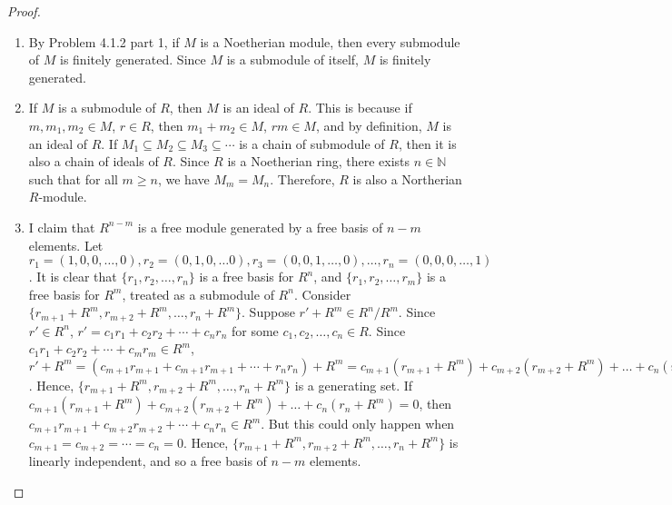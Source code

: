 \documentclass[12pt]{article}
\newcommand{\N}{\mathbb{N}}
\begin{document}
\begin{proof}
\begin{enumerate}
    \item By Problem 4.1.2 part 1, if $M$ is a Noetherian module, then every submodule of $M$ is finitely generated. Since $M$ is a submodule of itself, $M$ is finitely generated.
    \item  If $M$ is a submodule of $R$, then $M$ is an ideal of $R$. This is because if $m, m_1, m_2 \in M$, $r \in R$, then $m_1+m_2 \in M$, $rm \in M$, and by definition, $M$ is an ideal of $R$. If $M_1 \subseteq M_2 \subseteq M_3 \subseteq \cdots$ is a chain of submodule of $R$, then it is also a chain of ideals of $R$. Since $R$ is a Noetherian ring, there exists $n \in \N$ such that for all $m \geq n$, we have $M_m = M_n$. Therefore, $R$ is also a Northerian $R$-module.
    \item I claim that $R^{n-m}$ is a free module generated by a free basis of $n-m$ elements. Let $r_1 = (1, 0, 0, \ldots, 0), r_2 = (0, 1, 0, \ldots 0), r_3 = (0, 0, 1, \ldots, 0), \ldots, r_n = (0, 0, 0, \ldots, 1)$. It is clear that $\{r_1, r_2, \ldots, r_n\}$ is a free basis for $R^n$, and $\{r_1, r_2, \ldots, r_m\}$ is a free basis for $R^m$, treated as a submodule of $R^n$. Consider $\{r_{m+1} + R^m, r_{m+2} + R^m, \ldots, r_n + R^m\}$. Suppose $r' + R^m \in R^n/R^m$. Since $r' \in R^n$, $r' = c_1r_1 + c_2r_2 + \cdots + c_nr_n$ for some $c_1, c_2, \ldots, c_n \in R$. Since $c_1r_1 + c_2r_2 + \cdots + c_mr_m \in R^m$, $r'+R^m = (c_{m+1}r_{m+1}+ c_{m+1}r_{m+1}+\cdots+r_nr_n) + R^m = c_{m+1}(r_{m+1}+R^m)+c_{m+2}(r_{m+2}+R^m) + \ldots + c_n(r_n+R^m)$. Hence, $\{r_{m+1} + R^m, r_{m+2} + R^m, \ldots, r_n + R^m\}$ is a generating set. If $c_{m+1}(r_{m+1}+R^m)+c_{m+2}(r_{m+2}+R^m) + \ldots + c_n(r_n+R^m) = 0$, then $c_{m+1}r_{m+1} + c_{m+2}r_{m+2} + \cdots + c_nr_n \in R^m$. But this could only happen when $c_{m+1} = c_{m+2} = \cdots = c_n = 0$. Hence, $\{r_{m+1} + R^m, r_{m+2} + R^m, \ldots, r_n + R^m\}$ is linearly independent, and so a free basis of $n-m$ elements. \\


\end{enumerate}
\end{proof}
\end{document}
